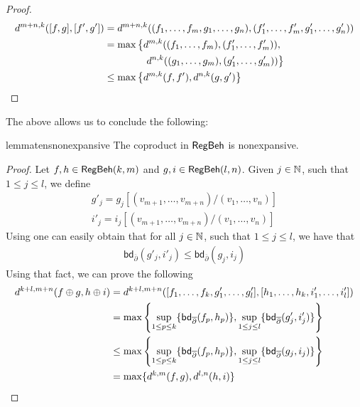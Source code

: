\begin{proof}
	\begin{align*}
		d^{m +n, k}([ f, g ], [ f', g' ]) &= d^{m +n, k}((f_1, \dots, f_m, g_1, \dots, g_n), (f'_1, \dots, f'_m, g'_1, \dots, g'_n)) \\
		&=\max \left\{d^{m,k}((f_1, \dots, f_m), (f'_1, \dots, f'_m)),\right.\\&\qquad \qquad\left. d^{n,k}((g_1, \dots, g_m), (g'_1, \dots, g'_m)) \right\}\\
		&\leq \max \left\{d^{m,k}(f,f'),d^{n,k}(g,g') \right\} \tag*{\hfill\qedhere}
	\end{align*}
\end{proof}
The above allows us to conclude the following:
\begin{restatable}{lemma}{tensnonexpansive}\label{lem:tens_nonexpansive}
	The coproduct in $\mathsf{RegBeh}$ is nonexpansive.
\end{restatable}
\begin{proof}
	Let $f,h \in \mathsf{RegBeh}(k,m)$ and $g,i \in \mathsf{RegBeh}(l,n)$. Given $j \in \mathbb{N}$, such that $1 \leq j \leq l$, we define
	\begin{gather*}
	g'_j = g_j[(v_{m + 1}, \dots, v_{m + n})/(v_1, \dots, v_n)]\\
	i'_j = i_j[(v_{m + 1}, \dots, v_{m + n})/(v_1, \dots, v_n)]
	\end{gather*}
	Using  one can easily obtain that for all $j \in \mathbb{N}$, such that $1 \leq j \leq l$, we have that
	\begin{align*}
		\mathsf{bd}_{\overline\partial} (g'_j, i'_j) \leq \mathsf{bd}_{\overline\partial} (g_j, i_j)
	\end{align*}
	Using that fact, we can prove the following
	\begin{align*}
		d^{k + l, m + n}(f \oplus g, h \oplus i) &= d^{k + l, m + n}([ f_1, \dots, f_k, g'_1, \dots, g'_l],[ h_1, \dots, h_k, i'_1, \dots, i'_l])\\
		&=\max \left\{\sup_{1 \leq p \leq k}\{\mathsf{bd}_{\overline\partial} (f_p, h_p)\}, \sup_{1 \leq j \leq l} \{\mathsf{bd}_{\overline\partial} (g'_j, i'_j)\} \right\}\\
		&\leq \max \left\{\sup_{1 \leq p \leq k}\{\mathsf{bd}_{\overline\partial} (f_p, h_p)\}, \sup_{1 \leq j \leq l} \{\mathsf{bd}_{\overline\partial} (g_j, i_j)\} \right\}\\
		&= \max \{d^{k,m}(f,g), d^{l,n}(h,i)\} \tag*{\hfill\qedhere}
	\end{align*}
\end{proof}
